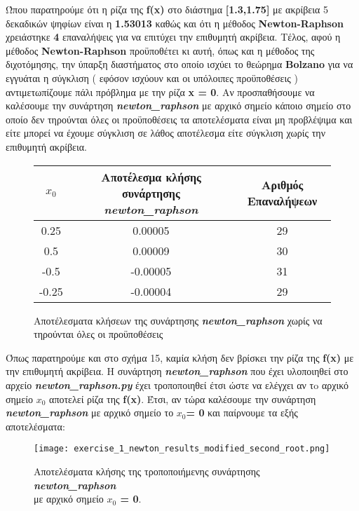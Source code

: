 \documentclass[First Project.tex]{subfiles}
\begin{document}
Ώπου παρατηρούμε ότι η ρίζα της \textlatin{\textbf{f(x)}} στο διάστημα \textlatin{\textbf{[1.3,1.75]}} με ακρίβεια 5 δεκαδικών ψηφίων 
είναι η \textbf{1.53013} καθώς και ότι η μέθοδος \textlatin{\textbf{Newton-Raphson}} χρειάστηκε \textbf{4} επαναλήψεις για να επιτύχει την 
επιθυμητή ακρίβεια. Τέλος, αφού η μέθοδος \textlatin{\textbf{Newton-Raphson}} προϋποθέτει κι αυτή, όπως και η μέθοδος της διχοτόμησης, την 
ύπαρξη διαστήματος στο οποίο ισχύει το θεώρημα \textlatin{\textbf{Bolzano}} για να εγγυάται η σύγκλιση ( εφόσον ισχύουν και οι υπόλοιπες 
προϋποθέσεις ) αντιμετωπίζουμε πάλι πρόβλημα με την ρίζα \textbf{\textlatin{x = 0}}. Αν προσπαθήσουμε να καλέσουμε την συνάρτηση
\textit{\textlatin{\textbf{newton\_raphson}}} με αρχικό σημείο κάποιο σημείο στο οποίο δεν τηρούνται όλες οι προϋποθέσεις τα αποτελέσματα
είναι μη προβλέψιμα και είτε μπορεί να έχουμε σύγκλιση σε λάθος αποτέλεσμα είτε σύγκλιση χωρίς την επιθυμητή ακρίβεια.
\begin{figure}[h!]
    \centering
    \captionsetup{justification=centering}
    \begin{center}
        \begin{tabular}{ |c|c|c| }       
            \hline
            \textbf{\textlatin{$x_{0}$}} & Αποτέλεσμα κλήσης συνάρτησης \textit{\textlatin{\textbf{newton\_raphson}}} & Αριθμός Επαναλήψεων \\
            \hline
            0.25 & 0.00005 & 29 \\ \hline
            0.5 & 0.00009 & 30 \\ \hline
            -0.5 & -0.00005 & 31 \\ \hline
            -0.25 & -0.00004 & 29 \\ [1ex]
            \hline
        \end{tabular}
        \caption{ Αποτέλεσματα κλήσεων της συνάρτησης \textit{\textlatin{\textbf{newton\_raphson}}} χωρίς να τηρούνται όλες οι προϋποθέσεις}
    \end{center}
\end{figure}

Όπως παρατηρούμε και στο σχήμα 15, καμία κλήση δεν βρίσκει την ρίζα της \textlatin{\textbf{f(x)}} με την επιθυμητή ακρίβεια. Η συνάρτηση 
\textit{\textlatin{\textbf{newton\_raphson}}} που έχει υλοποιηθεί στο αρχείο \textit{\textlatin{\textbf{newton\_raphson.py}}} έχει τροποποιηθεί 
έτσι ώστε να ελέγχει αν τo αρχικό σημείο \textbf{\textlatin{$x_{0}$}} αποτελεί ρίζα της \textlatin{\textbf{f(x)}}. Έτσι, αν τώρα
καλέσουμε την συνάρτηση \textit{\textlatin{\textbf{newton\_raphson}}} με αρχικό σημείο το \textlatin{\textbf{$x_{0}$= 0}} και παίρνουμε τα 
εξής αποτελέσματα:
\vspace{5mm}
\begin{figure}[h!]
    \centering
    \captionsetup{justification=centering}
    \begin{center}
    \texttt{[image: exercise\_1\_newton\_results\_modified\_second\_root.png]}    
    \caption{ Αποτελέσματα κλήσης της τροποποιήμενης συνάρτησης \textit{\textlatin{\textbf{newton\_raphson}}} \\ με αρχικό σημείο \textbf{\textlatin{$x_{0}$ = 0}}. }
    \end{center}
\end{figure}


\newpage

    
\end{document}
